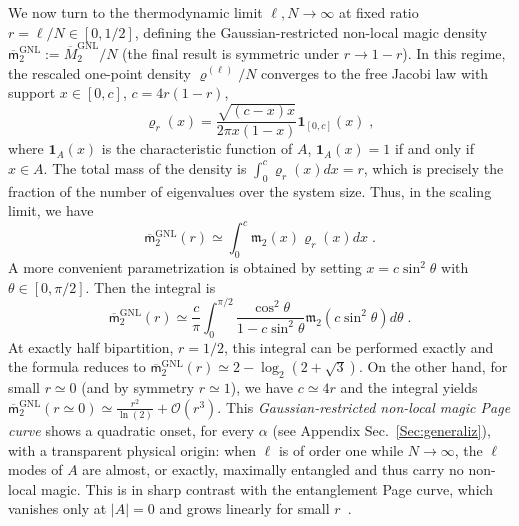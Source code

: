 \documentclass[prx,twocolumn,superscriptaddress,aps,10pt, frontmatterverbose, reprint,footinbib,longbibliography=true]{revtex4-2}
\newcommand{\RENYI}{\alpha}
\providecommand{\DIFaddtex}[1]{{\protect\color{red}#1}} %
\providecommand{\DIFaddbegin}{\protect\color{red}} %
\providecommand{\DIFaddend}{\protect\color{black}} %
\providecommand{\DIFaddtex}[1]{\texorpdfstring{\DIFaddtex{#1}}{#1}} %
\providecommand{\DIFadd}[1]{\texorpdfstring{\DIFaddtex{#1}}{#1}} %
\newcommand{\DIFaddincludegraphics}[2][]{{\color{blue}\fbox{\DIFOincludegraphics[#1]{#2}}}} %
\DeclareRobustCommand{\DIFaddbegin}{\DIFOaddbegin \let\includegraphics\DIFaddincludegraphics} %
\DeclareRobustCommand{\DIFaddend}{\DIFOaddend \let\includegraphics\DIFOincludegraphics} %
\begin{document}
We now turn to the thermodynamic limit $\ell,N\to\infty$ at fixed ratio $r=\ell/N\in[0,1/2]$, defining the Gaussian-restricted non-local magic density $\overline{\mathsf{m}}_2^\mathrm{GNL}:=\overline{M}_2^\mathrm{GNL}/N$ (the final result is symmetric under $r\to 1-r$).
In this regime, the rescaled  one-point density $\varrho^{(\ell)}/N$ converges to the free Jacobi law with support $x\in [0,c]$, $c=4r(1-r)$,
\begin{equation}
    \varrho_r(x) = \frac{\sqrt{(c-x)x}}{2\pi x(1-x)}\mathbf{1}_{[0,c]}(x)\;,
\end{equation}
where $\mathbf{1}_A(x)$ is the characteristic function of $A$, $\mathbf{1}_A(x)=1$ if and only if $x\in A$. 
The total mass of the density is $\int_0^c \varrho_r(x) dx=r$, which is precisely the fraction of the number of eigenvalues over the system size. 
Thus, in the scaling limit, we have
\begin{equation}
\overline{\mathsf{m}}_2^\mathrm{GNL}(r)\simeq \int_0^c \mathfrak{m}_2(x) \varrho_r(x)dx\;.
\end{equation}
A more convenient parametrization is obtained by setting $x=c\sin^2\theta$  with $\theta\in[0,\pi/2]$. Then the integral is 
\begin{equation}
\overline{\mathsf{m}}_2^\mathrm{GNL}(r)\simeq \frac{c}{\pi}\int_0^{\pi/2} \frac{\cos^2 \theta}{1-c\sin^2\theta} \mathfrak{m}_2(c\sin^2 \theta)d\theta\;.\label{eq:ziopin2}
\end{equation}
At exactly half bipartition, $r=1/2$, this integral can be performed exactly and the formula reduces to 
$\overline{\mathsf{m}}_2^\mathrm{GNL}(r)\simeq 2-\log_2(2+\sqrt{3})$.
On the other hand, for small $r\simeq 0$ (and by symmetry $r\simeq 1$), we have $c\simeq 4r$ and the integral yields $\overline{\mathsf{m}}_2^\mathrm{GNL}(r\simeq 0)\simeq \frac{r^2}{\ln(2)}+\mathcal{O}(r^3)$. 
This {\em Gaussian-restricted non-local magic Page curve} shows a  quadratic onset,  for every \DIFaddbegin \DIFadd{$\RENYI$ }\DIFaddend (see Appendix Sec.~\ref{Sec:generaliz}), with a transparent physical origin: when $\ell$ is of order one while $N\to\infty$, the $\ell$ modes of $A$ are almost, or exactly, maximally entangled and thus carry no non-local magic. 
This is in sharp contrast with the entanglement Page curve, which vanishes only at $|A|=0$ and grows linearly for small $r$~\cite{PhysRevE.106.034118,PhysRevLett.125.180604,PhysRevB.103.L241118}.
\end{document}

